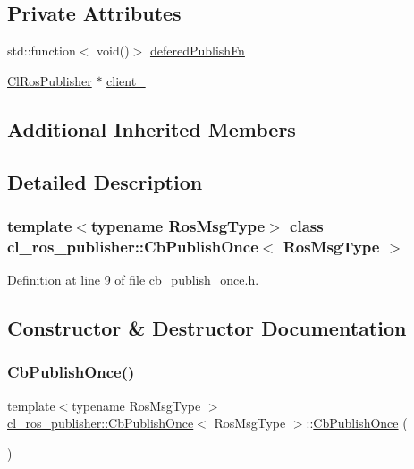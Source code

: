 \subsection*{Private Attributes}
\begin{DoxyCompactItemize}
\item 
std\+::function$<$ void()$>$ \hyperlink{classcl__ros__publisher_1_1CbPublishOnce_a6222a91fb87cd3118ca9f84ff857c696}{defered\+Publish\+Fn}
\item 
\hyperlink{classcl__ros__publisher_1_1ClRosPublisher}{Cl\+Ros\+Publisher} $\ast$ \hyperlink{classcl__ros__publisher_1_1CbPublishOnce_aabb127ac2192a295ce9d11c63f3c9595}{client\+\_\+}
\end{DoxyCompactItemize}
\subsection*{Additional Inherited Members}


\subsection{Detailed Description}
\subsubsection*{template$<$typename Ros\+Msg\+Type$>$\newline
class cl\+\_\+ros\+\_\+publisher\+::\+Cb\+Publish\+Once$<$ Ros\+Msg\+Type $>$}



Definition at line 9 of file cb\+\_\+publish\+\_\+once.\+h.



\subsection{Constructor \& Destructor Documentation}
\mbox{\label{classcl__ros__publisher_1_1CbPublishOnce_a9706b20ed8ed9af79396a446abf44344}} 
\subsubsection{\texorpdfstring{Cb\+Publish\+Once()}{CbPublishOnce()}\hspace{0.1cm}{\footnotesize\ttfamily [1/2]}}
{\footnotesize\ttfamily template$<$typename Ros\+Msg\+Type $>$ \\
\hyperlink{classcl__ros__publisher_1_1CbPublishOnce}{cl\+\_\+ros\+\_\+publisher\+::\+Cb\+Publish\+Once}$<$ Ros\+Msg\+Type $>$\+::\hyperlink{classcl__ros__publisher_1_1CbPublishOnce}{Cb\+Publish\+Once} (\begin{DoxyParamCaption}{ }\end{DoxyParamCaption})\hspace{0.3cm}{\ttfamily [inline]}}



